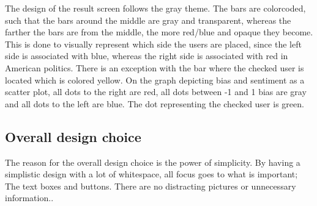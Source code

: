 
The design of the result screen follows the gray theme. The bars are colorcoded,
such that the bars around the middle are gray and transparent, whereas the
farther the bars are from the middle, the more red/blue and opaque they become.
This is done to visually represent which side the users are placed, since the
left side is associated with blue, whereas the right side is associated with red
in American politics. There is an exception with the bar where the checked user
is located which is colored yellow. On the graph depicting bias and sentiment as
a scatter plot, all dots to the right are red, all dots between -1 and 1 bias are
gray and all dots to the left are blue. The dot representing the checked user
is green.

\subsection{Overall design choice}
The reason for the overall design choice is the power of simplicity. By having a
simplistic design with a lot of whitespace, all focus goes to what is
important; The text boxes and buttons. There are no distracting
pictures or unnecessary information.\citep[p. 26 \& 32]{WebUI}.\\